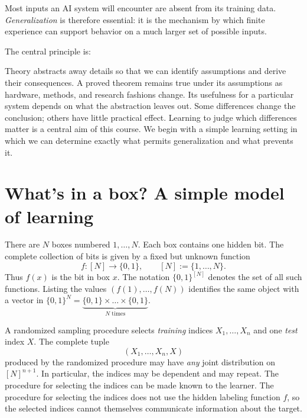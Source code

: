 \documentclass[11pt,twoside]{article}
\theoremstyle{definition}
\theoremstyle{remark}
\begin{document}
Most inputs an AI system will encounter are absent from its training
data. \emph{Generalization} is therefore essential: it is the mechanism by which
finite experience can support behavior on a much larger set of possible
inputs.

The central principle is:

\begin{center}
\end{center}

Theory abstracts away details so that we can identify assumptions and derive
their consequences. A proved theorem remains true under its assumptions as
hardware, methods, and research fashions change. Its usefulness for a particular
system depends on what the abstraction leaves out. Some differences change the
conclusion; others have little practical effect. Learning to judge which
differences matter is a central aim of this course. We begin with a simple
learning setting in which we can determine exactly what permits generalization
and what prevents it.

\section{What's in a box? A simple model of learning}
\label{sec:boxes}

There are $N$ boxes numbered $1,\ldots,N$. Each box contains one hidden bit.
The complete collection of bits is given by a fixed but unknown function
\[
f:[N]\longrightarrow\{0,1\},
\qquad [N]:=\{1,\ldots,N\}.
\]
Thus $f(x)$ is the bit in box $x$. The notation
$\{0,1\}^{[N]}$ denotes the set of all such functions. Listing the values
$(f(1),\ldots,f(N))$ identifies the same object with a vector in
$\{0,1\}^N = \underbrace{\{0,1\}\times \dots \times \{0,1\}}_{N \text{ times}}$.

A randomized sampling procedure selects \emph{training} indices
$X_1,\ldots,X_n$ and one \emph{test} index $X$.
The complete tuple
\[
(X_1,\ldots,X_n,X)
\]
produced by the randomized procedure may have \emph{any} joint distribution
on $[N]^{n+1}$.
In particular, the indices may be dependent and may repeat.
The procedure for selecting the indices can be made known to the learner.
The procedure for selecting the indices does not use the hidden labeling
function $f$, so the selected indices cannot themselves communicate
information about the target.
\end{document}
